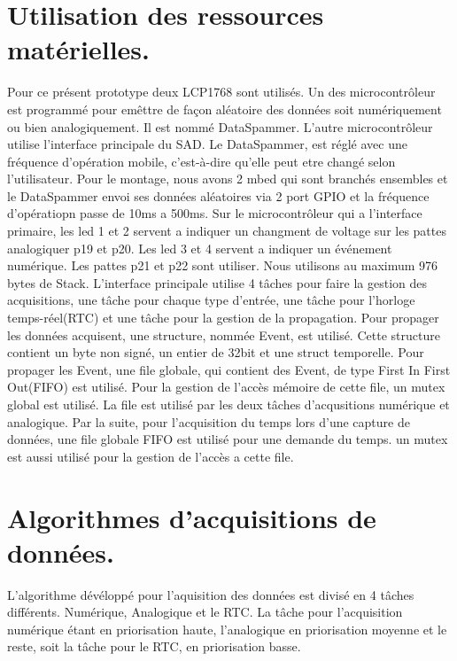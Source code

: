 \documentclass[12pt]{article}
\begin{document}
\section{Utilisation des ressources matérielles.}
Pour ce présent prototype deux LCP1768 sont utilisés. Un des microcontrôleur est programmé pour emêttre de façon aléatoire des données soit numériquement ou bien analogiquement. Il est nommé DataSpammer. L'autre microcontrôleur utilise l'interface principale du SAD. Le DataSpammer, est réglé avec une fréquence d'opération mobile, c'est-à-dire qu'elle peut etre changé selon l'utilisateur. Pour le montage, nous avons 2 mbed qui sont branchés ensembles et le DataSpammer envoi ses données aléatoires via 2 port GPIO et la fréquence d'opératiopn passe de 10ms a 500ms. Sur le microcontrôleur qui a l'interface primaire, les led 1 et 2 servent a indiquer un changment de voltage sur les pattes analogiquer p19 et p20. Les led 3 et 4 servent a indiquer un événement numérique. Les pattes p21 et p22 sont utiliser. Nous utilisons au maximum 976 bytes de Stack.
\newpage
L'interface principale utilise 4 tâches pour faire la gestion des acquisitions, une tâche pour chaque type d'entrée, une tâche pour l'horloge temps-réel(RTC) et une tâche pour la gestion de la propagation. Pour propager les données acquisent, une structure, nommée Event, est utilisé. Cette structure contient un byte non signé, un entier de 32bit et une struct temporelle. Pour propager les Event, une file globale, qui contient des Event, de type First In First Out(FIFO) est utilisé. Pour la gestion de l'accès mémoire de cette file, un mutex global est utilisé. La file est utilisé par les deux tâches d'acqusitions numérique et analogique. Par la suite, pour l'acquisition du temps lors d'une capture de données, une file globale FIFO est utilisé pour une demande du temps. un mutex est aussi utilisé pour la gestion de l'accès a cette file. 

\section{Algorithmes d'acquisitions de données.}
L'algorithme dévéloppé pour l'aquisition des données est divisé en 4 tâches différents. Numérique, Analogique et le RTC. La tâche pour l'acquisition numérique étant en priorisation haute, l'analogique en priorisation moyenne et le reste, soit la tâche pour le RTC, en priorisation basse.
\end{document}
